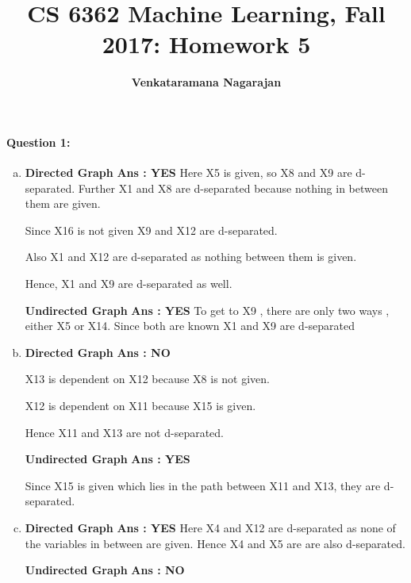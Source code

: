 \documentclass[letterpaper,11pt]{article}
\title{CS 6362 Machine Learning, Fall 2017: Homework 5}
\date{}
\author{\bf Venkataramana Nagarajan}
\begin{document}
\maketitle

\paragraph{Question 1:} 
\begin{enumerate}[(a)]

\item
\textbf{Directed Graph} 
\newline
\textbf{Ans : YES}
\newline
Here X5 is given, so X8 and X9 are d-separated.
Further X1 and X8 are d-separated because nothing in between them are given.

Since X16 is not given X9 and X12 are d-separated.

Also X1 and X12 are d-separated as nothing between them is given.

Hence, X1 and X9 are d-separated as well.

\bigskip
\textbf{Undirected Graph}
\newline
\textbf{Ans : YES}
\newline
To get to X9 , there are only two ways , either X5 or X14.
Since both are known X1 and X9 are d-separated

\item
\textbf{Directed Graph}
\newline
\textbf{Ans : NO}

X13 is dependent on X12 because X8 is not given.

X12 is dependent on X11 because X15 is given.

Hence X11 and X13 are not d-separated.

\bigskip
\textbf{Undirected Graph}
\newline
\textbf{Ans : YES}

Since X15 is given which lies in the path between X11 and X13, they are d-separated.

\item
\textbf{Directed Graph}
\newline
\textbf{Ans : YES}
\newline
Here X4 and X12 are d-separated as none of the variables in between are given.
Hence X4 and X5 are are also d-separated.

\textbf{Undirected Graph}
\newline
\textbf{Ans : NO}
\newline


\end{enumerate}
\end{document}

